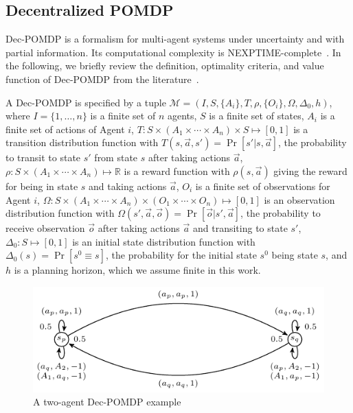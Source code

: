 \subsection{Decentralized POMDP}
\label{sect:dssat-dec-pomdp}
Dec-POMDP is a formalism for multi-agent systems under uncertainty and with partial information.
Its computational complexity is NEXPTIME-complete~\cite{Bernstein2002}.
In the following, we briefly review the definition, optimality criteria,
and value function of Dec-POMDP from the literature~\cite{Oliehoek2016}.

A Dec-POMDP is specified by a tuple $\mathcal{M}=(I,S,\{A_i\},T,\rho,\{O_i\},\Omega,\Delta_0,h)$, where
$I=\{1,\ldots,n\}$ is a finite set of $n$ agents,
$S$ is a finite set of states,
$A_i$ is a finite set of actions of Agent $i$,
$T:S\times(A_1\times\cdots\times A_n)\times S\mapsto [0,1]$ is a transition distribution function with
$T(s,\Vec{a},s')=\Pr[s'|s,\vec{a}]$,
the probability to transit to state $s'$ from state $s$ after taking actions $\vec{a}$,
$\rho:S\times(A_1\times\cdots\times A_n)\mapsto\mathbb{R}$ is a reward function with
$\rho(s,\vec{a})$ giving the reward for being in state $s$ and taking actions $\vec{a}$,
$O_i$ is a finite set of observations for Agent $i$,
$\Omega:S\times(A_1\times\cdots\times A_n)\times(O_1\times\cdots\times O_n)\mapsto[0,1]$ is an observation distribution function with
$\Omega(s',\Vec{a},\vec{o})=\Pr[\vec{o}|s',\vec{a}]$,
the probability to receive observation $\vec{o}$ after taking actions $\vec{a}$ and transiting to state $s'$, $\Delta_0:S\mapsto [0,1]$ is an initial state distribution function with $\Delta_0(s)=\Pr[s^0 \equiv s]$,
the probability for the initial state $s^0$ being state $s$,
and $h$ is a planning horizon, which we assume finite in this work.

\begin{figure}[t]
    \centering
    \includegraphics{fig/build/dec-pomdp-example.pdf}
    \caption{A two-agent Dec-POMDP example}
    \label{fig:dssat-dec-pomdp-state-graph}
\end{figure}

